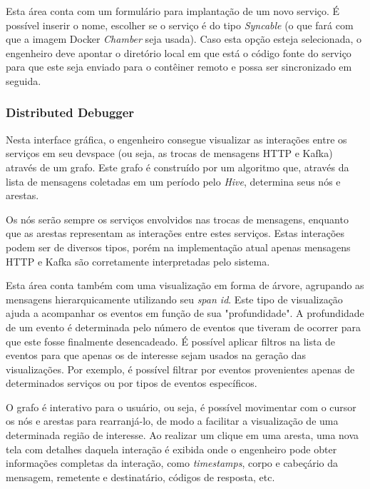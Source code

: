             Esta área conta com um formulário para implantação de um novo serviço. É possível inserir o nome, escolher se o serviço é do tipo \textit{Syncable} (o que fará com que a imagem Docker \textit{Chamber} seja usada). Caso esta opção esteja selecionada, o engenheiro deve apontar o diretório local em que está o código fonte do serviço para que este seja enviado para o contêiner remoto e possa ser sincronizado em seguida.


        \subsubsection{Distributed Debugger}
            Nesta interface gráfica, o engenheiro consegue visualizar as interações entre os serviços em seu devspace (ou seja, as trocas de mensagens HTTP e Kafka) através de um grafo. Este grafo é construído por um algoritmo que, através da lista de mensagens coletadas em um período pelo \textit{Hive}, determina seus nós e arestas.
            
            Os nós serão sempre os serviços envolvidos nas trocas de mensagens, enquanto que as arestas representam as interações entre estes serviços. Estas interações podem ser de diversos tipos, porém na implementação atual apenas mensagens HTTP e Kafka são corretamente interpretadas pelo sistema.
            
            Esta área conta também com uma visualização em forma de árvore, agrupando as mensagens hierarquicamente utilizando seu \textit{span id}. Este tipo de visualização ajuda a acompanhar os eventos em função de sua "profundidade". A profundidade de um evento é determinada pelo número de eventos que tiveram de ocorrer para que este fosse finalmente desencadeado.
            É possível aplicar filtros na lista de eventos para que apenas os de interesse sejam usados na geração das visualizações. Por exemplo, é possível filtrar por eventos provenientes apenas de determinados serviços ou por tipos de eventos específicos.
            
            O grafo é interativo para o usuário, ou seja, é possível movimentar com o cursor os nós e arestas para rearranjá-lo, de modo a facilitar a visualização de uma determinada região de interesse. Ao realizar um clique em uma aresta, uma nova tela com detalhes daquela interação é exibida onde o engenheiro pode obter informações completas da interação, como \textit{timestamps}, corpo e cabeçário da mensagem, remetente e destinatário, códigos de resposta, etc.

